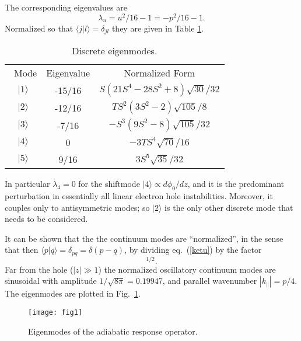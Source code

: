 \documentclass{jpp}
\def\ket#1{|#1\rangle}
\def\bra#1{\langle#1}
\begin{document}
The corresponding eigenvalues are
\begin{equation}
  \label{eigenvalues}
  \lambda_u= u^2/16-1=-p^2/16-1.
\end{equation}
Normalized so that
$\bra{j}\ket{l}=\delta_{jl}$ they are given in Table \ref{discrete}. 
\begin{table}
  \center
\begin{tabular}{ccc}\
  Mode & Eigenvalue & Normalized Form\\
  $\ket{1}$& -15/16&$S(21S^4 - 28S^2 + 8)\sqrt{30}/32$\\
  $\ket{2}$& -12/16&$TS^2(3S^2 - 2)\sqrt{105}/8$\\
  $\ket{3}$& -7/16 &$-S^3(9S^2 - 8)\sqrt{105}/32 $\\
  $\ket{4}$&  0 &$-3TS^4\sqrt{70}/16 $\\
  $\ket{5}$&  9/16 &$3S^5\sqrt{35}/32 $\\
\end{tabular}
\caption{Discrete eigenmodes.\label{discrete}}
\end{table}
\noindent
In particular $\lambda_4=0$ for the shiftmode
$\ket{4}\propto d\phi_0/dz$, and it is the predominant perturbation in
essentially all linear electron hole instabilities. Moreover, it
couples only to antisymmetric modes; so $\ket{2}$ is the only other
discrete mode that needs to be considered.

It can
be shown that the the continuum modes are ``normalized'', in the sense
that then $\bra{p}\ket{q}=\delta_{pq}=\delta(p-q)$, by dividing eq.\
(\ref{ketu}) by the factor
\begin{equation}
  [8\pi(p^2+1^2)(p^2+2^2)(p^2+3^2)(p^2+4^2)(p^2+5^2)]^{1/2}.
  \label{normfactor}
\end{equation}
Far
from the hole ($|z|\gg1$) the normalized oscillatory continuum modes are
sinusoidal with amplitude $1/\sqrt{8\pi}=0.19947$, and parallel wavenumber
$|k_\parallel|=p/4$. The eigenmodes are plotted in Fig.\
\ref{modeplots}.
\begin{figure}\center
  \texttt{[image: fig1]}
  \caption{Eigenmodes of the adiabatic response operator.\label{modeplots}}
\end{figure}
\end{document}
